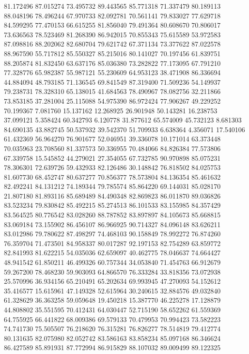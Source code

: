 81.172496
87.015274
73.495732
89.443565
85.771318
71.337479
80.189113
88.048196
78.496244
67.970733
82.092781
70.561141
79.833027
77.629718
84.599295
77.470153
66.615255
81.856040
79.491364
80.608670
70.806017
73.636563
78.523469
81.268390
86.942015
70.855343
75.615589
53.972583
87.098816
88.202062
82.680704
79.621742
67.371134
73.377622
87.022578
88.967590
55.717812
85.550327
85.215016
80.141027
70.197456
61.839751
88.205874
81.832450
63.637176
85.036380
73.282822
77.173095
67.791210
77.328776
65.982387
55.987121
55.230609
64.953123
38.471908
86.336694
44.884094
48.793185
71.136545
69.841549
87.319400
71.509236
54.149937
79.238731
78.328310
65.138015
41.684563
78.490967
78.082756
32.211866
73.853185
37.281004
25.115088
54.975390
86.972424
77.906267
49.229252
70.199367
7.081760
15.137162
12.268925
26.901948
50.143281
16.238753
37.099121
5.358424
60.342793
6.120778
31.877612
65.574009
45.732123
8.681303
84.690135
43.882745
50.537932
39.542370
51.709933
6.638364
4.356071
17.540106
61.432369
56.964270
76.901677
52.046951
39.336078
10.171014
63.373448
70.035963
23.708560
81.337573
50.336955
70.484066
84.826384
77.573806
67.339758
15.545852
44.279021
27.354055
67.732785
90.970898
85.075231
78.306301
72.639726
59.432933
82.126486
30.148842
76.818502
84.025753
81.607730
68.452747
80.637277
70.856377
78.573804
84.136354
85.461632
82.492241
84.131212
74.189344
79.785574
85.864220
69.144031
85.028170
21.807180
81.893116
85.689489
84.490348
82.869823
86.011870
89.036826
83.523234
79.830842
85.492215
85.274513
86.101533
83.155985
84.357429
83.564525
80.776542
83.028260
88.787852
83.897897
84.105673
85.668815
83.069184
73.155902
86.456107
86.966925
90.714327
84.096148
83.626211
83.012986
79.780622
87.498297
74.468103
90.158849
78.992272
76.874260
76.359704
71.473501
84.958337
80.017287
92.197153
82.754289
63.859772
82.841993
81.622215
54.035036
62.659097
40.462775
78.046637
74.664427
48.941542
61.850211
46.499326
60.757344
34.053840
71.454763
66.912679
59.267200
78.468230
59.903093
64.866570
76.333284
33.818356
73.072938
25.570996
36.934156
65.210491
65.202634
69.993945
47.270093
54.152612
35.416577
15.615961
47.149328
52.615964
30.240615
32.884576
49.032840
61.328629
36.363258
59.059648
19.450218
15.387770
46.225278
17.128879
44.808802
35.551595
70.412431
64.030447
52.715190
58.652262
61.559369
64.755925
66.441822
68.009386
69.579133
70.479953
70.994423
73.582223
74.741730
75.505507
76.218620
76.315281
76.826277
78.514819
79.412774
80.131635
82.075980
82.052742
83.586163
83.858234
85.097168
86.346624
86.427589
85.891931
87.772994
86.915829
88.107032
89.009499
89.122325
